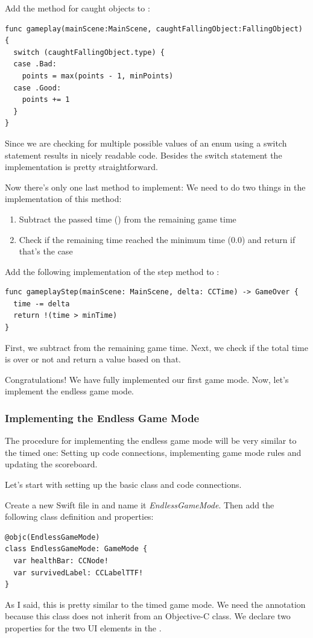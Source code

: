 \begin{leftbar}
Add the method for caught objects to :
\begin{lstlisting}
func gameplay(mainScene:MainScene, caughtFallingObject:FallingObject) {
  switch (caughtFallingObject.type) {
  case .Bad:
    points = max(points - 1, minPoints)
  case .Good:
    points += 1
  }
}
\end{lstlisting}
\end{leftbar}
Since we are checking for multiple possible values of an enum using a switch
statement results in nicely readable code. Besides the switch statement the
implementation is pretty straightforward.

Now there's only one last method to implement:
 We need to do two things in the
implementation of this method:
\begin{enumerate}
  \item Subtract the passed time () from the remaining game
  time
  \item Check if the remaining time reached the minimum time (0.0) and return
   if that's the case
\end{enumerate}
\begin{leftbar}
Add the following implementation of the step method to
:
\begin{lstlisting}
func gameplayStep(mainScene: MainScene, delta: CCTime) -> GameOver {
  time -= delta
  return !(time > minTime)
}
\end{lstlisting}
\end{leftbar}
First, we subtract  from the remaining game time. Next, we
check if the total time is over or not and return a  value
based on that.

Congratulations! We have fully implemented our first game mode. Now, let's
implement the endless game mode.

\subsubsection{Implementing the Endless Game Mode}
The procedure for implementing the endless game mode will be very similar to the
timed one: Setting up code connections, implementing game mode rules and
updating the scoreboard.

Let's start with setting up the basic class and code connections.
\begin{leftbar}
Create a new Swift file in \xcode{} and name it \textit{EndlessGameMode}. Then
add the following class definition and properties:
\begin{lstlisting}
@objc(EndlessGameMode)
class EndlessGameMode: GameMode {
  var healthBar: CCNode!
  var survivedLabel: CCLabelTTF!
}
\end{lstlisting}
\end{leftbar}
As I said, this is pretty similar to the timed game mode. We need the
 annotation because this class does not inherit from an
Objective-C class. We declare two properties for the two UI elements in the
 \ccbfile{}.

